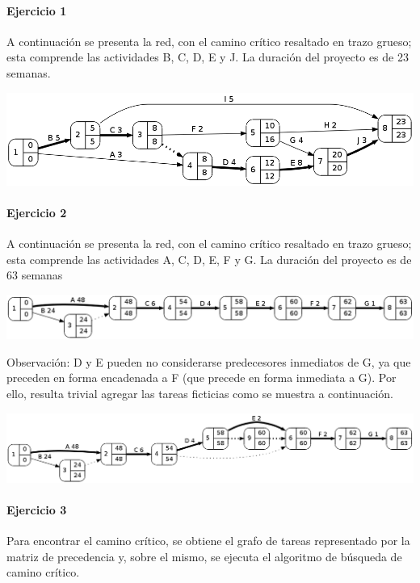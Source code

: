 \documentclass[a4paper,10pt]{article}
\begin{document}
\paragraph{Ejercicio 1} A continuación se presenta la red, con el camino crítico resaltado en trazo grueso; esta comprende las actividades B, C, D, E y J. La duración del proyecto es de 23 semanas.

    \begin{center}
	\includegraphics[scale=0.4,keepaspectratio=true]{img/ej1-red.png} 
	\end{center}

\paragraph{Ejercicio 2} A continuación se presenta la red, con el camino crítico resaltado en trazo grueso; esta comprende las actividades A, C, D, E, F y G. La duración del proyecto es de 63 semanas %

    \begin{center}
	\includegraphics[scale=0.4]{img/ej2.png} 
	\end{center}
 
 Observaci\'on: D y E pueden no considerarse predecesores inmediatos de G, ya que preceden en forma encadenada a F (que precede en forma inmediata a G). 
Por ello, resulta trivial agregar las tareas ficticias como se muestra a continuación.  
      \begin{center}
	\includegraphics[scale=0.4]{img/ej2-bis.png} 
	\end{center}

   
\paragraph{Ejercicio 3}
  Para encontrar el camino crítico, se obtiene el grafo de tareas representado por la matriz de precedencia y, sobre el mismo, se ejecuta el algoritmo de búsqueda de camino crítico.
\end{document}
